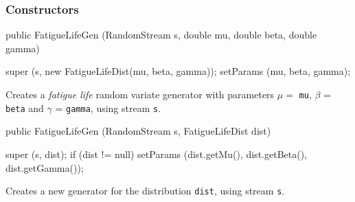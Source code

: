 \subsubsection* {Constructors}
\begin{code}

   public FatigueLifeGen (RandomStream s, double mu, double beta,
                                          double gamma) \begin{hide} {
      super (s, new FatigueLifeDist(mu, beta, gamma));
      setParams (mu, beta, gamma);
   }\end{hide}
\end{code} 
\begin{tabb}  Creates a \emph{fatigue life} random variate generator with
  parameters $\mu =$ \texttt{mu}, $\beta $ = \texttt{beta} and $\gamma$ =
  \texttt{gamma}, using stream \texttt{s}. 
\end{tabb}
\begin{code}

   public FatigueLifeGen (RandomStream s, FatigueLifeDist dist) \begin{hide} {
      super (s, dist);
      if (dist != null)
         setParams (dist.getMu(), dist.getBeta(), dist.getGamma());
   }\end{hide}
\end{code}
  \begin{tabb} Creates a new generator for the distribution \texttt{dist},
     using stream \texttt{s}.
  \end{tabb}

